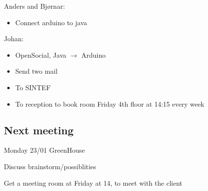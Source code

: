 Anders and Bjørnar:
\begin{itemize}
\item Connect arduino to java
\end{itemize}


Johan:
\begin{itemize}
\item OpenSocial, Java $\rightarrow$ Arduino
\item Send two mail
\item To SINTEF
\item To reception to book room Friday 4th floor at 14:15 every week
\end{itemize}

\subsection{Next meeting}
Monday 23/01 GreenHouse

Discuss brainstorm/possiblities

Get a meeting room at Friday at 14, to meet with the client